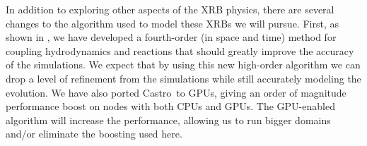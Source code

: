 \documentclass[preprint,times,tighten]{aastex63}
\newcommand{\castro}{{\sf Castro}}
\newcommand{\pynucastro}{{\sf pynucastro}}
\newcommand{\MarginPar}[1]{
    \marginpar{\vskip-\baselineskip%
               \raggedright%
               \tiny\sffamily%
               {\color{red}\hrule%
               \smallskip%
               #1\par%
               \smallskip%
               \hrule}}%
}
\begin{document}







In addition to exploring other aspects of the XRB physics, there are several changes to the algorithm used to
model these XRBs we will pursue.  First, as shown in \citet{castro-sdc}, we have
developed a fourth-order (in space and time) method for coupling
hydrodynamics and reactions that should greatly improve the accuracy
of the simulations.  We expect that by using this new high-order
algorithm we can drop a level of refinement from the simulations while
still accurately modeling the evolution.  We have also ported
\castro\ to GPUs, giving an order of magnitude performance boost on
nodes with both CPUs and GPUs.  The GPU-enabled algorithm will
increase the performance, allowing us to run bigger domains and/or
eliminate the boosting used here. 
\end{document}
